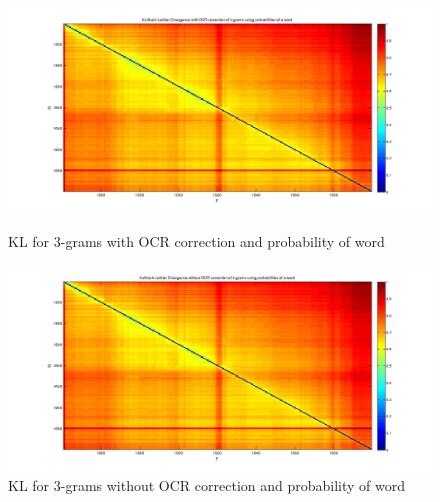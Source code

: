\begin{figure}[h!]
    \begin{minipage}[b]{0.48\linewidth}
        \includegraphics[scale=0.15]{Pictures/kullback-leibler/KL_3-grams_with_correction_proba.jpg}
        \caption{KL for 3-grams with OCR correction and probability of word}
        \label{}
    \end{minipage}\hfill
    \begin{minipage}[b]{0.5\linewidth}
        \includegraphics[scale=0.15]{Pictures/kullback-leibler/KL_3-grams_without_correction_proba.jpg}
        \caption{KL for 3-grams without OCR correction and probability of word}
        \label{}
    \end{minipage}\hfill
\end{figure}

